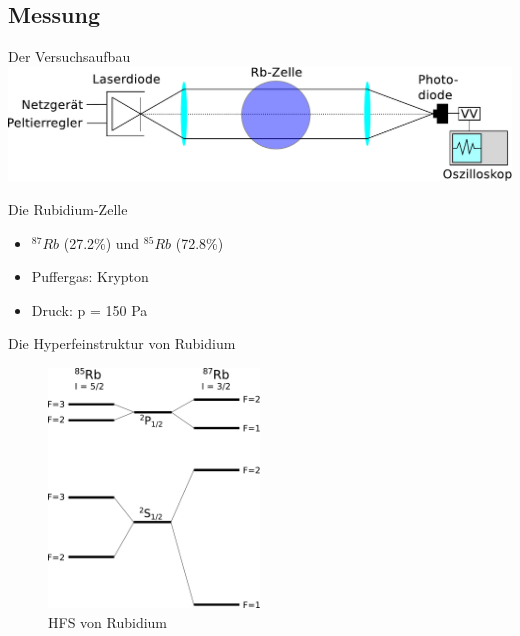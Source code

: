 \documentclass{beamer}
\begin{document}
\subsection{Messung}
\begin{frame}{Der Versuchsaufbau}
	\centering \includegraphics[width=1\textwidth]{Bilder/ABHFS.pdf}
	\begin{block}{Die Rubidium-Zelle}
	\begin{itemize}
	\item $^{87}Rb$ (27.2\%) und $^{85}Rb$ (72.8\%)
	\item Puffergas: Krypton
	\item Druck: p = 150 Pa
	\end{itemize}
	\end{block}
\end{frame}

\begin{frame}{Die Hyperfeinstruktur von Rubidium}
	\begin{figure}[H]
	\centering \includegraphics[width=0.5\textwidth]{Bilder/HFSRb.pdf}
	\caption{HFS von Rubidium}
	\end{figure}
\end{frame}
\end{document}
